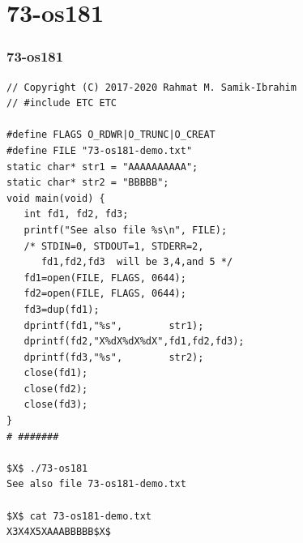 \documentclass[aspectratio=169, xcolor=table, notheorems, hyperref={pdfpagelabels=false}]{beamer}
\begin{document}
\section{73-os181}
\begin{frame}[fragile]
\frametitle{73-os181}
\begin{lstlisting}[basicstyle=\ttfamily\tiny]
// Copyright (C) 2017-2020 Rahmat M. Samik-Ibrahim
// #include ETC ETC

#define FLAGS O_RDWR|O_TRUNC|O_CREAT
#define FILE "73-os181-demo.txt"
static char* str1 = "AAAAAAAAAA";
static char* str2 = "BBBBB";
void main(void) {
   int fd1, fd2, fd3;
   printf("See also file %s\n", FILE);
   /* STDIN=0, STDOUT=1, STDERR=2,
      fd1,fd2,fd3  will be 3,4,and 5 */
   fd1=open(FILE, FLAGS, 0644);
   fd2=open(FILE, FLAGS, 0644);
   fd3=dup(fd1);
   dprintf(fd1,"%s",        str1);
   dprintf(fd2,"X%dX%dX%dX",fd1,fd2,fd3);
   dprintf(fd3,"%s",        str2);
   close(fd1);
   close(fd2);
   close(fd3);
}
# #######

$X$ ./73-os181 
See also file 73-os181-demo.txt

$X$ cat 73-os181-demo.txt 
X3X4X5XAAABBBBB$X$

\end{lstlisting}
\end{frame}

\end{document}
